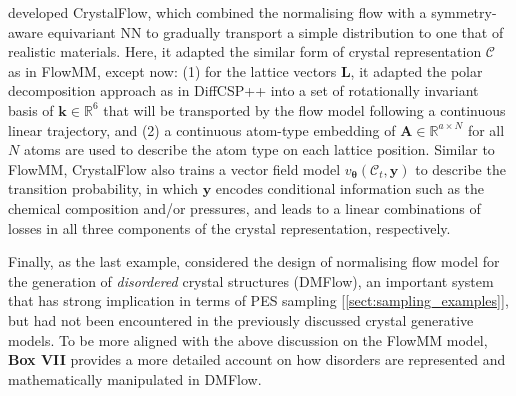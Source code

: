 \citet{luo2025crystalflow} developed  CrystalFlow, which combined the normalising flow with a symmetry-aware equivariant NN to gradually transport a simple distribution to one that of realistic materials. Here, it adapted the similar form of crystal representation $\mathcal{C}$ as in FlowMM,\cite{miller2024flowmm} except now: (1) for the lattice vectors $\bm{L}$, it adapted the polar decomposition approach as in DiffCSP++\cite{jiao2024space} into a set of rotationally invariant basis of $\bm{k}\in\mathbb{R}^6$ that will be transported by the flow model following a continuous linear trajectory, and (2) a continuous atom-type embedding of $\bm{A}\in\mathbb{R}^{a\times N}$ for all $N$ atoms are used to describe the atom type on each lattice position. Similar to FlowMM, CrystalFlow also trains a vector field model $v_{\boldsymbol{\theta}}(\mathcal{C}_t,\bm{y})$ to describe the transition probability, in which $\bm{y}$ encodes conditional information such as the chemical composition and/or pressures, and leads to a linear combinations of losses in all three components of the crystal representation, respectively. 

Finally, as the last example, \citet{wu2026dmflow} considered the design of normalising flow model for the generation of \emph{disordered} crystal structures (DMFlow), an important system that has strong implication in terms of PES sampling [\cref{sect:sampling_examples}], but had not been encountered in the previously discussed crystal generative models. To be more aligned with the above discussion on the FlowMM model, \textbf{Box VII} provides a more detailed account on how disorders are represented and mathematically manipulated in DMFlow.

